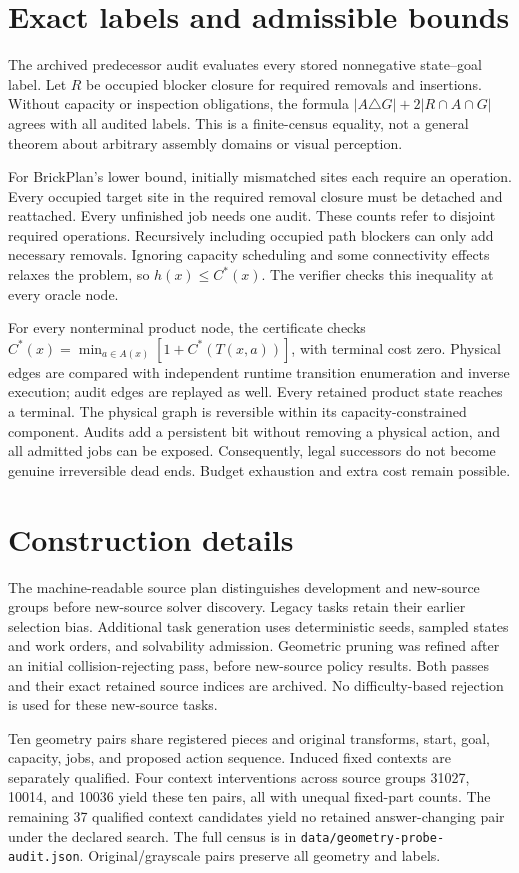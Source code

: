 \section{Exact labels and admissible bounds}
The archived predecessor audit evaluates every stored nonnegative
state--goal label. Let $R$ be occupied blocker closure for required
removals and insertions. Without capacity or inspection obligations, the
formula $|A\triangle G|+2|R\cap A\cap G|$ agrees with all
\OldLabels{} audited labels. This is a finite-census equality, not a
general theorem about arbitrary assembly domains or visual perception.

For BrickPlan's lower bound, initially mismatched sites each require an
operation. Every occupied target site in the required removal closure
must be detached and reattached. Every unfinished job needs one audit.
These counts refer to disjoint required operations. Recursively including
occupied path blockers can only add necessary removals. Ignoring capacity
scheduling and some connectivity effects relaxes the problem, so
$h(x)\leq C^*(x)$. The verifier checks this inequality at every oracle node.

For every nonterminal product node, the certificate checks
$C^*(x)=\min_{a\in A(x)}[1+C^*(T(x,a))]$, with terminal cost zero.
Physical edges are compared with independent runtime transition
enumeration and inverse execution; audit edges are replayed as well.
Every retained product state reaches a terminal. The physical graph is
reversible within its capacity-constrained component. Audits add a
persistent bit without removing a physical action, and all admitted jobs
can be exposed. Consequently, legal successors do not become genuine
irreversible dead ends. Budget exhaustion and extra cost remain possible.

\section{Construction details}
The machine-readable source plan distinguishes development and
new-source groups before new-source solver discovery. Legacy tasks retain
their earlier selection bias. Additional task generation uses deterministic
seeds, sampled states and work orders, and solvability admission. Geometric
pruning was refined after an initial collision-rejecting pass, before
new-source policy results. Both passes and their exact retained source
indices are archived. No difficulty-based rejection is used for these
new-source tasks.

Ten geometry pairs share registered pieces and original transforms,
start, goal, capacity, jobs, and proposed action sequence. Induced fixed
contexts are separately qualified. Four context interventions across
source groups 31027, 10014, and 10036 yield these ten pairs, all with
unequal fixed-part counts. The remaining 37 qualified context candidates
yield no retained answer-changing pair under the declared search.
The full census is in
\texttt{data/geometry-probe-audit.json}.
Original/grayscale pairs preserve all geometry and labels.

